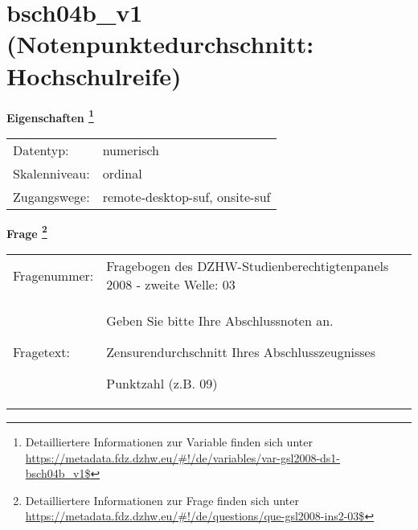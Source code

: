 
    \setcounter{footnote}{0}

    \vspace*{-1.8cm}
	\section{bsch04b\_v1 (Notenpunktedurchschnitt: Hochschulreife)}
	\label{section:bsch04b_v1}



    \vspace*{0.5cm}
    \noindent\textbf{Eigenschaften
	\footnote{Detailliertere Informationen zur Variable finden sich unter
		\url{https://metadata.fdz.dzhw.eu/\#!/de/variables/var-gsl2008-ds1-bsch04b_v1$}}}\\
	\begin{tabularx}{\hsize}{@{}lX}
	Datentyp: & numerisch \\
	Skalenniveau: & ordinal \\
	Zugangswege: &
	  remote-desktop-suf, 
	  onsite-suf
 \\
    \end{tabularx}



				\vspace*{0.5cm}
                \noindent\textbf{Frage
	                \footnote{Detailliertere Informationen zur Frage finden sich unter
		              \url{https://metadata.fdz.dzhw.eu/\#!/de/questions/que-gsl2008-ins2-03$}}}\\
				\begin{tabularx}{\hsize}{@{}lX}
					Fragenummer: &
					  Fragebogen des DZHW-Studienberechtigtenpanels 2008 - zweite Welle:
					  03
 \\
					Fragetext: & Geben Sie bitte Ihre Abschlussnoten an.\par  Zensurendurchschnitt Ihres Abschlusszeugnisses\par  Punktzahl (z.B. 09) \\
				\end{tabularx}





